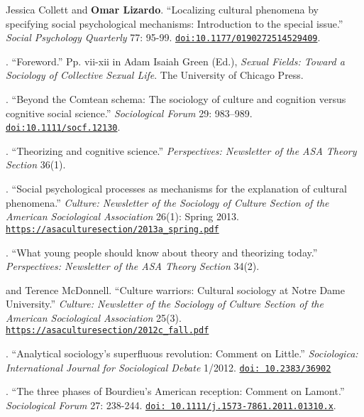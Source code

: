 
\ind Jessica Collett and {\bf Omar Lizardo}. ``Localizing cultural phenomena by specifying social psychological mechanisms: Introduction to the special issue.'' {\em Social Psychology Quarterly} 77: 95-99. \href{https://doi.org/10.1177/0190272514529409}{\nolinkurl{doi:10.1177/0190272514529409}}.

. ``Foreword.'' Pp. vii-xii in Adam Isaiah Green (Ed.), {\em Sexual Fields: Toward a Sociology of Collective Sexual Life}. The University of Chicago Press.

. ``Beyond the Comtean schema: The sociology of culture and cognition versus cognitive social science.''  {\em Sociological Forum} 29: 983–989. \href{https://doi.org/10.1111/socf.12130}{\nolinkurl{doi:10.1111/socf.12130}}.

. ``Theorizing and cognitive science.'' {\em Perspectives: Newsletter of the ASA Theory Section} 36(1).

.  ``Social psychological processes as mechanisms for the explanation of cultural phenomena.'' \emph{Culture: Newsletter of the Sociology of Culture Section of the American Sociological Association} 26(1): Spring 2013. \href{https://asaculturesection.files.wordpress.com/2018/03/2013a_spring.pdf}{\nolinkurl{https://asaculturesection/2013a_spring.pdf}}

. ``What young people should know about theory and theorizing today.'' {\em Perspectives: Newsletter of the ASA Theory Section} 34(2).

 and Terence McDonnell. ``Culture warriors: Cultural sociology at Notre Dame University.'' \emph{Culture: Newsletter of the Sociology of Culture Section of the American Sociological Association} 25(3).  \href{https://asaculturesection.files.wordpress.com/2018/03/2012c_fall.pdf}{\nolinkurl{https://asaculturesection/2012c_fall.pdf}}

.  ``Analytical sociology’s superfluous revolution: Comment on Little.'' {\em Sociologica: International Journal for Sociological Debate} 1/2012. \href{https://www.rivisteweb.it/doi/10.2383/36902}{\nolinkurl{doi: 10.2383/36902}}
 
. ``The three phases of Bourdieu's American reception:  Comment on Lamont.''  {\em Sociological Forum} 27: 238-244. \href{https://doi.org/10.1111/j.1573-7861.2011.01310.x}{\nolinkurl{doi: 10.1111/j.1573-7861.2011.01310.x}}.
 